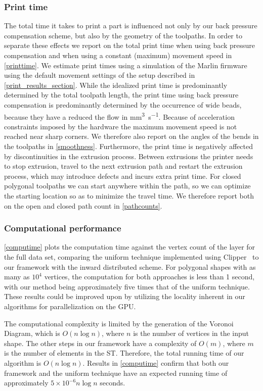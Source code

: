{
\subsubsection{Print time}
The total time it takes to print a part is influenced not only by our back pressure compensation scheme, but also by the geometry of the toolpaths.
In order to separate these effects we report on the total print time when using back pressure compensation and when using a constant (maximum) movement speed in \cref{printtime}.
We estimate print times using a simulation of the Marlin firmware using the default movement settings of the setup described in \cref{print_results_section}.
While the idealized print time is predominantly determined by the total toolpath length, the print time using back pressure compensation is predominantly determined by the occurrence of wide beads, because they have a reduced the flow in \si{\milli\meter\cubed\per\second}.
Because of acceleration constraints imposed by the hardware the maximum movement speed is not reached near sharp corners.
We therefore also report on the angles of the bends in the toolpaths in \cref{smoothness}.
Furthermore, the print time is negatively affected by discontinuities in the extrusion process.
Between extrusions the printer needs to stop extrusion, travel to the next extrusion path and restart the extrusion process, which may introduce defects and incurs extra print time.
For closed polygonal toolpaths we can start anywhere within the path, so we can optimize the starting location so as to minimize the travel time.
We therefore report both on the open and closed path count in \cref{pathcounts}.
}


\subsubsection{Computational performance}
\cref{computime} plots the computation time against the vertex count of the layer for the full data set, comparing the uniform technique implemented using Clipper~\cite{johnson2014clipper} to our framework with the inward distributed scheme.
For polygonal shapes with as many as $10^4$ vertices, the computation for both approaches is less than 1 second, with our method being approximately five times that of the uniform technique.
These results could be improved upon by utilizing the locality inherent in our algorithms for parallelization on the GPU.

The computational complexity is limited by the generation of the Voronoi Diagram, which is $O(n \log n)$, where $n$ is the number of vertices in the input shape.
The other steps in our framework have a complexity of $O(m)$, where $m$ is the number of elements in the ST.
Therefore, the total running time of our algorithm is $O(n \log n)$.
Results in \cref{computime} confirm that both our framework and the uniform technique have an expected running time of approximately $5 \times 10^{-6} n \log n$ seconds.


















